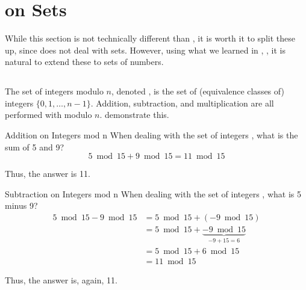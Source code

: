 \section{ on Sets}\label{sec:Number_Theory_on_Sets}
While this section is not technically different than , it is worth it to split these up, since  does not deal with sets.
However, using what we learned in , , it is natural to extend these to sets of numbers.

\subsection{\texorpdfstring{\TextIntsModN{}}{Sets of Integers Modulo n}}\label{subsec:Z_mod_n}
\begin{definition}[\TextIntsModN{}]\label{def:Z_mod_n}
  The set of integers modulo $n$, denoted \TextIntsModN{}, is the set of (equivalence classes of) integers $\lbrace 0, 1, \ldots , n-1 \rbrace$.
  Addition, subtraction, and multiplication are all performed with modulo $n$.
   demonstrate this.
\end{definition}

\begin{example}[]{Addition on Integers mod n}
  When dealing with the set of integers , what is the sum of 5 and 9?
  \tcblower{}
  \begin{equation*}
    5 \bmod 15 + 9 \bmod 15 = 11 \bmod 15
  \end{equation*}

  Thus, the answer is 11.
\end{example}

\begin{example}[]{Subtraction on Integers mod n}
  When dealing with the set of integers , what is 5 minus 9?
  \tcblower{}
  \begin{align*}
    5 \bmod 15 - 9 \bmod 15 &= 5 \bmod 15 + (-9 \bmod 15) \\
                            &= 5 \bmod 15 + \underbrace{-9 \bmod 15}_{-9 + 15 = 6} \\
                            &= 5 \bmod 15 + 6 \bmod 15 \\
                            &= 11 \bmod 15
  \end{align*}

  Thus, the answer is, again, 11.
\end{example}

